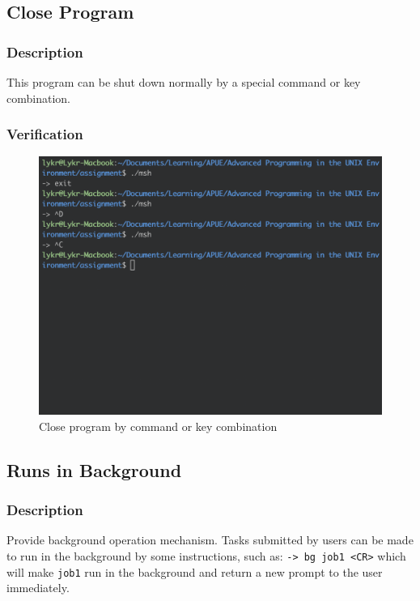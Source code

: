 \documentclass{article}
\begin{document}
\newpage
\subsection{Close Program}

\subsubsection{Description}

This program can be shut down normally by a special command or key combination.

\subsubsection{Verification}

\begin{figure}[h]
\centering
\includegraphics[scale=0.5]{fig/v2-1.png}
\caption{Close program by command or key combination}
\end{figure}

\newpage
\subsection{Runs in Background}

\subsubsection{Description}

Provide background operation mechanism. Tasks submitted by users can be made to run in the background by some instructions, such as: \verb|-> bg job1 <CR>| which will make \verb|job1| run in the background and return a new prompt to the user immediately.
\end{document}
